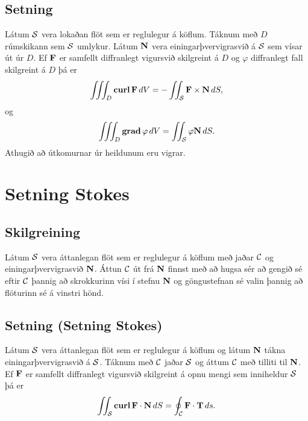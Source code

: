 \documentclass[a4paper,10pt,icelandic]{sphinxmanual}
\begin{document}
\subsection{Setning}
\label{Kafli6:id10}
Látum \(\cal S\) vera lokaðan flöt sem er reglulegur á köflum.
Táknum með \(D\) rúmskikann sem \(\cal S\) umlykur. Látum
\(\mbox{${\bf N}$}\) vera einingarþvervigrasvið á \(\cal S\) sem
vísar út úr \(D\). Ef \(\mbox{${\bf F}$}\) er samfellt
diffranlegt vigursvið skilgreint á \(D\) og \(\varphi\)
diffranlegt fall skilgreint á \(D\) þá er
\begin{gather}
\begin{split}\displaystyle \int\!\!\!\int\!\!\!\int_D\mbox{${\rm\bf curl\,}$}\mbox{${\bf F}$}\,dV=-\int\!\!\!\int_{\cal S}\mbox{${\bf F}$}\times\mbox{${\bf N}$}\,dS,\end{split}\notag
\end{gather}
og
\begin{gather}
\begin{split}\displaystyle \int\!\!\!\int\!\!\!\int_D\mbox{${\rm\bf grad\,}$}\varphi\,dV=\int\!\!\!\int_{\cal S}\varphi\mbox{${\bf N}$}\,dS.\end{split}\notag
\end{gather}
Athugið að útkomurnar úr heildunum eru vigrar.


\section{Setning Stokes}
\label{Kafli6:setning-stokes}

\subsection{Skilgreining}
\label{Kafli6:id11}
Látum \(\cal S\) vera áttanlegan flöt sem er reglulegur á köflum með
jaðar \(\cal C\) og einingarþvervigrasvið \(\mbox{${\bf N}$}\).
Áttun \(\cal C\) út frá \(\mbox{${\bf N}$}\) finnst með að hugsa
sér að gengið sé eftir \(\cal C\) þannig að skrokkurinn vísi í
stefnu \(\mbox{${\bf N}$}\) og göngustefnan sé valin þannig að
flöturinn sé á vinstri hönd.


\subsection{Setning (Setning Stokes)}
\label{Kafli6:setning-setning-stokes}
Látum \(\cal S\) vera áttanlegan flöt sem er reglulegur á köflum og
látum \(\mbox{${\bf N}$}\) tákna einingarþvervigrasvið á
\(\cal S\). Táknum með \(\cal C\) jaðar \(\cal S\) og áttum
\(\cal C\) með tilliti til \(\mbox{${\bf N}$}\). Ef
\(\mbox{${\bf F}$}\) er samfellt diffranlegt vigursvið skilgreint á
opnu mengi sem inniheldur \(\cal S\) þá er
\begin{gather}
\begin{split}\displaystyle \int\!\!\!\int_{\cal S} \mbox{${\rm\bf curl\,}$}\mbox{${\bf F}$}\cdot\mbox{${\bf N}$}\,dS=\oint_{\cal C}\mbox{${\bf F}$}\cdot \mbox{${\bf T}$}\,ds.\end{split}\notag
\end{gather}
\end{document}
